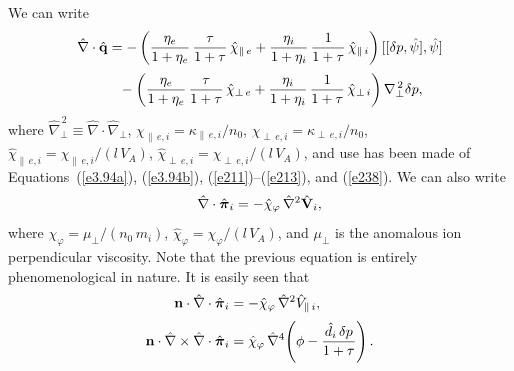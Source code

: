 \documentclass[notitlepage,12pt]{article}
\newcommand{\bpi}{\mbox{\boldmath$\pi$}}
\begin{document}
We can write
\begin{align}
\hat{\nabla}\cdot \hat{\bf q} &=- \left(\frac{\eta_e}{1+\eta_e}\,\frac{\tau}{1+\tau}\,\hat{\chi}_{\parallel\,e} + \frac{\eta_i}{1+\eta_i}\,\frac{1}{1+\tau}\,\hat{\chi}_{\parallel\,i}\right)[[\delta p,\hat{\psi}],\hat{\psi}]\nonumber\\[0.5ex]
&\phantom{=} - \left(\frac{\eta_e}{1+\eta_e}\,\frac{\tau}{1+\tau}\,\hat{\chi}_{\perp\,e} + \frac{\eta_i}{1+\eta_i}\,\frac{1}{1+\tau}\,\hat{\chi}_{\perp\,i}\right)\nabla_\perp^{\,2} \delta p,\label{e260}
\end{align}
where $\hat{\nabla}_\perp^{\,2}\equiv \hat{\nabla}\cdot\hat{\nabla}_\perp$, $\chi_{\parallel\,e,i} = \kappa_{\parallel\,e,i}/n_0$, $\chi_{\perp\,e,i} = \kappa_{\perp\,e,i}/n_0$, $\hat{\chi}_{\parallel\,e,i}=
\chi_{\parallel\,e,i}/(l\,V_A)$,  $\hat{\chi}_{\perp\,e,i}=
\chi_{\perp\,e,i}/(l\,V_A)$, and use has been made of Equations~(\ref{e3.94a}),  (\ref{e3.94b}), (\ref{e211})--(\ref{e213}), and (\ref{e238}). 
We can also
write
\begin{equation}
\hat{\nabla}\cdot\hat{\bpi}_i =- \hat{\chi}_\varphi\,\hat{\nabla}^2\hat{\bf V}_i,
\end{equation}
where $\chi_\varphi = \mu_{\perp}/(n_0\,m_i)$, $\hat{\chi}_\varphi = \chi_\varphi/(l\,V_A)$, and $\mu_\perp$ is the anomalous
ion perpendicular viscosity. Note that the previous equation is entirely phenomenological in nature.  It is easily seen that
\begin{align}\label{e262}
{\bf n}\cdot\hat{\nabla}\cdot\hat{\bpi}_i&= -\hat{\chi}_\varphi\,\hat{\nabla}^{2}\hat{V}_{\parallel\,i},\\[0.5ex]
{\bf n}\cdot\hat{\nabla}\times \hat{\nabla}\cdot\hat{\bpi}_i&= \hat{\chi}_\varphi \,\hat{\nabla}^4\!\left(\phi - \frac{\hat{d}_i\,\delta p}{1+\tau}\right).\label{e263}
\end{align}
\end{document}
